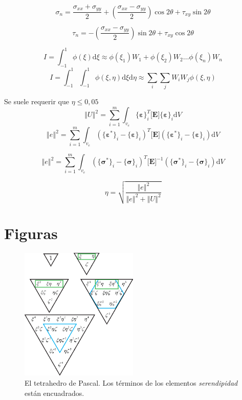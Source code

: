 \documentclass[11pt, a4paper,titlepage]{article}
\newcommand{\vvert}[1]{\left\Vert #1\right\Vert}
\newcommand{\di}{\textrm{d}}
\newcommand{\sigmab}{\boldsymbol{\sigma}}
\newcommand{\varepsilonb}{\boldsymbol{\varepsilon}}
\newcommand{\Mme}[1]{\boldsymbol{[}\mathbf{#1} \boldsymbol{]}}
\newcommand{\Cme}[1]{\boldsymbol{\{ }\mathbf{#1} \boldsymbol{\}} }
\newcommand{\ME}{\Mme{E}}
\newcommand{\feaQP}{null.tex}
\newcommand{\annexFile}{null.tex}
\begin{document}
\begin{equation}
\sigma_{n}=\frac{\sigma_{xx}+\sigma_{yy}}{2}+\left(\frac{\sigma_{xx}-\sigma_{yy}}{2}\right)\cos 2\theta +\tau_{xy}\sin 2\theta 
\end{equation}

\begin{equation}
\tau_{n}=-\left(\frac{\sigma_{xx}-\sigma_{yy}}{2}\right)\sin 2\theta +\tau_{xy}\cos 2\theta 
\end{equation}

\begin{equation}
I=\int^1_{-1} \phi(\xi) \di \xi \approx \phi(\xi_1) W_1+\phi(\xi_2) W_2 \ldots \phi(\xi_n) W_n
\end{equation}
\begin{equation}
I=\int^1_{-1} \int^1_{-1}\phi(\xi,\eta) \di \xi \di \eta\approx \sum_i \sum_j W_i W_j\phi(\xi,\eta) 
\end{equation}

Se suele requerir que $\eta\leq 0,05$
\[
\vvert{U}^2 = \sum^m_{i=1}\int_{v_e} \Cme{\varepsilonb}_i^T \ME \Cme{\varepsilonb}_i \di V
\]
\[
\vvert{e}^2=\sum_{i=1}^m \int_{v_e} \left( \Cme{\varepsilonb^*}_i - \Cme{\varepsilonb}_i\right)^T \ME \left( \Cme{\varepsilonb^*}_i - \Cme{\varepsilonb}_i\right) \di V
\]

\[
\vvert{e}^2=\sum_{i=1}^m \int_{v_e} \left( \Cme{\sigmab^*}_i - \Cme{\sigmab}_i\right)^T \ME ^{-1} \left( \Cme{\sigmab^*}_i - \Cme{\sigmab}_i\right) \di V
\]

\[
\eta = \sqrt{\frac{\vvert{e}^2}{\vvert{e}^2+\vvert{U}^2}}
\]



\section*{Figuras}
\begin{figure}[htb!]
	\centering
	\includegraphics[width=0.5\textwidth]{fig/pascalsTetra.eps}
	\caption{El tetrahedro de Pascal. Los términos de los elementos \textit{serendipidad} están encuadrados.}
	\label{fig:PascalsTetrahedron}
\end{figure}





\end{document}
